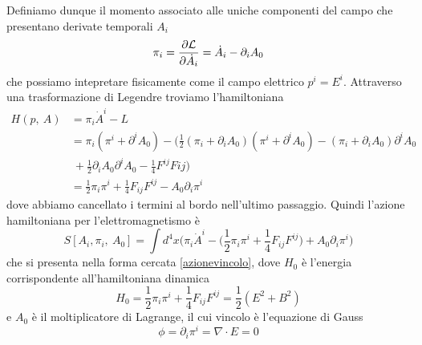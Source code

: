     Definiamo dunque il momento associato alle uniche componenti del campo che presentano derivate temporali $A_i$
\begin{equation*}
    \pi_i = \frac{\partial\mathcal L}{\partial\dot A_i} = \dot A_i - \partial_i A_0
\end{equation*}
    che possiamo intepretare fisicamente come il campo elettrico $p^i = E^i$. Attraverso una trasformazione di Legendre troviamo l'hamiltoniana  
\begin{equation*}
\begin{aligned}
    H(p, ~A) & = \pi_i \dot A^i - L \\ & = \pi_i (\pi^i + \partial^i A_0) - \Big(\frac{1}{2} (\pi_i + \partial_i A_0)(\pi^i + \partial^i A_0) - (\pi_i + \partial_i A_0) \partial^i A_0 \\ & ~ + \frac{1}{2} \partial_i A_0 \partial^i A_0 - \frac{1}{4} F^{ij} F{ij}\Big) \\ & = \frac{1}{2} \pi_i \pi^i + \frac{1}{4} F_{ij} F^{ij} - A_0 \partial_i \pi^i
\end{aligned}
\end{equation*}
    dove abbiamo cancellato i termini al bordo nell'ultimo passaggio. Quindi l'azione hamiltoniana per l'elettromagnetismo è
\begin{equation}
    S[A_i, \pi_i, ~A_0] = \int d^4 x \Big ( \pi_i \dot A^i - \Big ( \frac{1}{2} \pi_i \pi^i + \frac{1}{4} F_{ij} F^{ij} \Big) + A_0 \partial_i \pi^i \Big)
\end{equation}
    che si presenta nella forma cercata \eqref{azionevincolo}, dove $H_0$ è l'energia corrispondente all'hamiltoniana dinamica 
\begin{equation*}
    H_0 = \frac{1}{2} \pi_i \pi^i + \frac{1}{4} F_{ij} F^{ij} = \frac{1}{2} (E^2 + B^2)
\end{equation*}
    e $A_0$ è il moltiplicatore di Lagrange, il cui vincolo è l'equazione di Gauss
\begin{equation*}
    \phi = \partial_i \pi^i = \nabla \cdot E = 0
\end{equation*}

